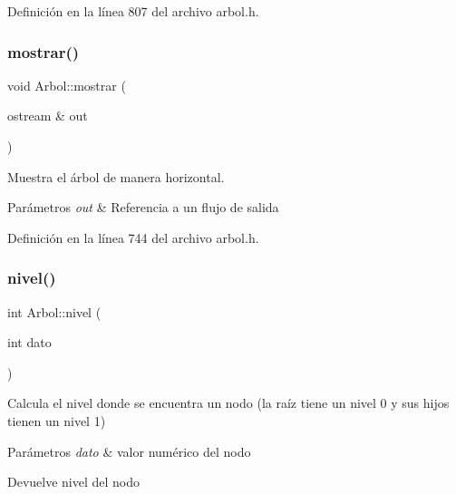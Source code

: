 Definición en la línea 807 del archivo arbol.\+h.

\mbox{\label{classArbol_a61749974f55056420f4e5a76eb664809}} 
\subsubsection{\texorpdfstring{mostrar()}{mostrar()}}
{\footnotesize\ttfamily void Arbol\+::mostrar (\begin{DoxyParamCaption}\item[{ostream \&}]{out }\end{DoxyParamCaption})}



Muestra el árbol de manera horizontal. 


\begin{DoxyParams}{Parámetros}
{\em out} & Referencia a un flujo de salida \\
\hline
\end{DoxyParams}


Definición en la línea 744 del archivo arbol.\+h.

\mbox{\label{classArbol_accd2dd2f8012067c1a2d77fd14c64546}} 
\subsubsection{\texorpdfstring{nivel()}{nivel()}\hspace{0.1cm}{\footnotesize\ttfamily [1/2]}}
{\footnotesize\ttfamily int Arbol\+::nivel (\begin{DoxyParamCaption}\item[{int}]{dato }\end{DoxyParamCaption})}



Calcula el nivel donde se encuentra un nodo (la raíz tiene un nivel 0 y sus hijos tienen un nivel 1) 


\begin{DoxyParams}{Parámetros}
{\em dato} & valor numérico del nodo \\
\hline
\end{DoxyParams}
\begin{DoxyReturn}{Devuelve}
nivel del nodo 
\end{DoxyReturn}


